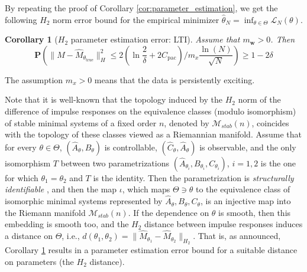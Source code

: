 \documentclass{ifacconf}
\def\rvw{{\mathbf{w}}}
\newcommand{\bP}{\mathbf{P}}
\newtheorem{corollary}{Corollary}[section]
\begin{document}
  By repeating the proof of Corollary \ref{cor:parameter_estimation}, we get the following $H_2$ norm error bound for the empirical minimizer
  $\hat{\theta}_N=\inf_{\theta \in \Theta} \mathcal{L}_N(\theta)$. 
  \begin{corollary}[$H_2$ parameter estimation error: LTI]
    \label{col:lti}
    Assume that $m_{\rvw} > 0$. Then 
   \[ 
     \bP(\|M-\hat{M}_{\theta_{\text{true}}}\|_H^2 \le 2(\ln\dfrac{2}{\delta}+ 2C_{\text{pac}})/m_{x} \frac{\ln(N)}{\sqrt{N}}) \ge 1-2\delta
  \]
  \end{corollary}
 The assumption $m_x > 0$ means that the data is persistently exciting.

 Note that it is well-known \cite{RalfPeeters} that the topology induced by the $H_2$ norm of the difference of impulse responses on the 
 equivalence classes (modulo isomorphism) of stable minimal systems of a fixed order $n$, denoted by $\mathcal{M}_{stab}(n)$, coincides with the topology of these classes viewed as a Riemannian manifold.
 Assume that 
 for every $\theta \in \Theta$, $(\hat{A}_{\theta},B_{\theta})$ is controllable, $(\hat{C}_{\theta},\hat{A}_{\theta})$ is observable, and the only isomorphism $T$ between two parametrizations  $(\hat{A}_{\theta_i},B_{\theta_i},C_{\theta_i})$, $i=1,2$
 is the one for which $\theta_1=\theta_2$ and $T$ is the identity.
 Then the parametrization is \emph{structurally identifiable} \cite{Hof}, and 
 then the map $\iota$, which maps $\Theta \ni \theta$ to the equivalence class of isomorphic minimal systems represented by $\hat{A}_{\theta},B_{\theta},C_{\theta}$, %
is an injective map into the Riemann manifold $\mathcal{M}_{stab}(n)$.
If the dependence on $\theta$ is smooth, then this embedding is smooth too, and the $H_2$ distance between impulse responses induces
a distance on $\Theta$, i.e., $d(\theta_1,\theta_2)=\|\hat{M}_{\theta_1}-\hat{M}_{\theta_2}\|_{H_2}$.
That is, as announced, Corollary \ref{col:lti} results in a parameter estimation error bound for a suitable distance on parameters (the $H_2$ distance).
 
\end{document}
